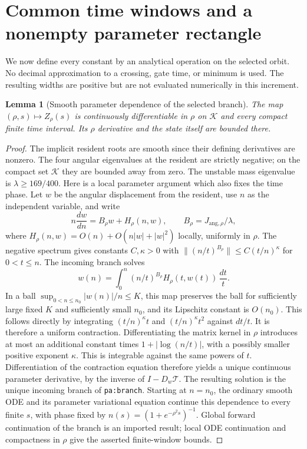 \documentclass[11pt]{article}
\numberwithin{equation}{section}
\newtheorem{lemma}[theorem]{Lemma}
\theoremstyle{remark}\newtheorem{remark}[theorem]{Remark}
\newcommand{\1}{\mathbf 1}
\begin{document}
\section{Common time windows and a nonempty parameter rectangle}
\label{inc:AN06:v2:commonwindows}
We now define every constant by an analytical operation on the selected
orbit. No decimal approximation to a crossing, gate time, or minimum is
used. The resulting widths are positive but are not evaluated numerically
in this increment.

\begin{lemma}[Smooth parameter dependence of the selected branch]
\label{inc:AN06:v2:branchsmooth}
The map $(\rho,s)\mapsto Z_\rho(s)$ is continuously differentiable in
$\rho$ on $\mathcal K$ and every compact finite time interval. Its
$\rho$ derivative and the state itself are bounded there.
\end{lemma}
\begin{proof}
The implicit resident roots are smooth since their defining derivatives
are nonzero. The four angular eigenvalues at the resident are strictly
negative; on the compact set $\mathcal K$ they are bounded away from zero.
The unstable mass eigenvalue is $\lambda\ge169/400$.
Here is a local parameter argument which also fixes the time phase.
Let $w$ be the angular displacement from the resident, use $n$ as the
independent variable, and write
\[
 n\frac{dw}{dn}=B_\rho w+H_\rho(n,w),\qquad
 B_\rho=J_{\mathrm{ang},\rho}/\lambda,
\]
where $H_\rho(n,w)=O(n)+O(n|w|+|w|^2)$ locally, uniformly in $\rho$.
The negative spectrum gives constants $C,\kappa>0$ with
$\|(n/t)^{B_\rho}\|\le C(t/n)^\kappa$ for $0<t\le n$.
The incoming branch solves
\[
 w(n)=\int_0^n(n/t)^{B_\rho}H_\rho(t,w(t))\,\frac{dt}{t}.
\]
In a ball $\sup_{0<n\le n_0}|w(n)|/n\le K$, this map preserves the ball
for sufficiently large fixed $K$ and sufficiently small $n_0$, and its
Lipschitz constant is $O(n_0)$. This follows directly by integrating
$(t/n)^\kappa t$ and $(t/n)^\kappa t^2$ against $dt/t$.
It is therefore a uniform contraction.
Differentiating the matrix kernel in $\rho$ introduces at most an
additional constant times $1+|\log(n/t)|$, with a possibly smaller
positive exponent $\kappa$. This is integrable against the same powers
of $t$. Differentiation of the contraction equation therefore yields a
unique continuous parameter derivative, by the inverse of $I-D_w\mathcal T$.
The resulting solution is the unique incoming branch of
\texttt{pa:branch}. Starting at $n=n_0$, the ordinary smooth ODE and its
parameter variational equation continue this dependence to every finite
$s$, with phase fixed by $n(s)=(1+e^{-\rho^2s})^{-1}$.
Global forward continuation of the branch is an imported result; local
ODE continuation and compactness in $\rho$ give the asserted finite-window
bounds.
\end{proof}
\end{document}
